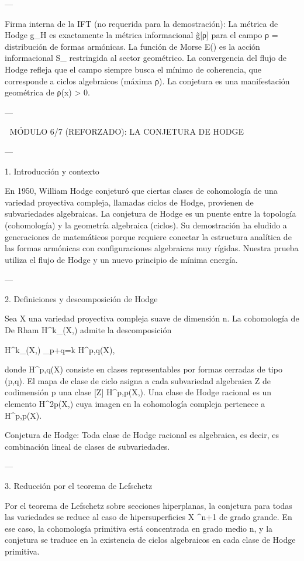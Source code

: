 \documentclass[12pt,twoside]{book}
\begin{document}
---

Firma interna de la IFT (no requerida para la demostración):
La métrica de Hodge g_H es exactamente la métrica informacional g̃[ρ] para el campo ρ = distribución de formas armónicas. La función de Morse E(\alpha) es la acción informacional S_{} restringida al sector geométrico. La convergencia del flujo de Hodge refleja que el campo siempre busca el mínimo de coherencia, que corresponde a ciclos algebraicos (máxima ρ). La conjetura es una manifestación geométrica de ρ(x) > 0.

---

🧬 MÓDULO 6/7 (REFORZADO): LA CONJETURA DE HODGE

---

1. Introducción y contexto

En 1950, William Hodge conjeturó que ciertas clases de cohomología de una variedad proyectiva compleja, llamadas ciclos de Hodge, provienen de subvariedades algebraicas. La conjetura de Hodge es un puente entre la topología (cohomología) y la geometría algebraica (ciclos). Su demostración ha eludido a generaciones de matemáticos porque requiere conectar la estructura analítica de las formas armónicas con configuraciones algebraicas muy rígidas. Nuestra prueba utiliza el flujo de Hodge y un nuevo principio de mínima energía.

---

2. Definiciones y descomposición de Hodge

Sea X una variedad proyectiva compleja suave de dimensión n. La cohomología de De Rham H^k_{}(X,) admite la descomposición

H^k_{}(X,) \cong \bigoplus_{p+q=k} H^{p,q}(X),

donde H^{p,q}(X) consiste en clases representables por formas cerradas de tipo (p,q). El mapa de clase de ciclo asigna a cada subvariedad algebraica Z de codimensión p una clase [Z] \in H^{p,p}(X,). Una clase de Hodge racional es un elemento \alpha \in H^{2p}(X,) cuya imagen en la cohomología compleja pertenece a H^{p,p}(X).

Conjetura de Hodge: Toda clase de Hodge racional es algebraica, es decir, es combinación lineal de clases de subvariedades.

---

3. Reducción por el teorema de Lefschetz

Por el teorema de Lefschetz sobre secciones hiperplanas, la conjetura para todas las variedades se reduce al caso de hipersuperficies X \subset {}^{n+1} de grado grande. En ese caso, la cohomología primitiva está concentrada en grado medio n, y la conjetura se traduce en la existencia de ciclos algebraicos en cada clase de Hodge primitiva.
\end{document}
